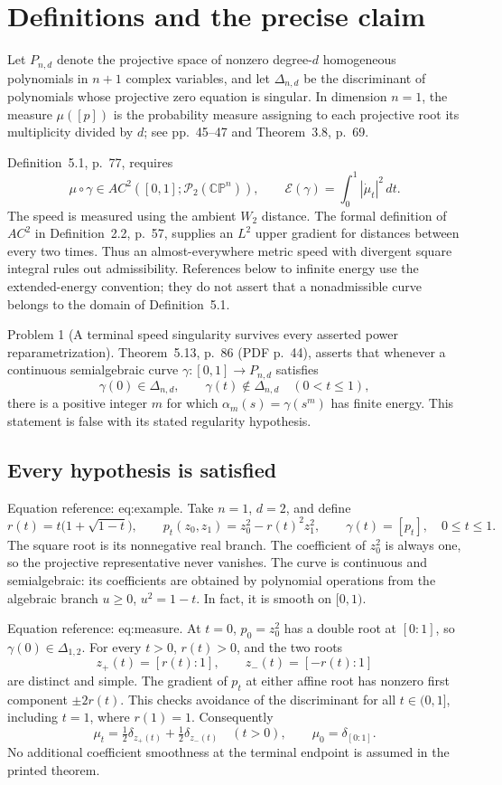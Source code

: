 \documentclass[10pt]{article}
\begin{document}
\section*{Definitions and the precise claim}
Let \(P_{n,d}\) denote the projective space of nonzero degree-\(d\) homogeneous polynomials in \(n+1\) complex variables, and let \(\Delta_{n,d}\) be the discriminant of polynomials whose projective zero equation is singular. In dimension \(n=1\), the measure \(\mu([p])\) is the probability measure assigning to each projective root its multiplicity divided by \(d\); see pp. 45–47 and Theorem 3.8, p. 69.\par
Definition 5.1, p. 77, requires \[\mu\circ\gamma\in AC^2([0,1];\mathcal P_2(\mathbb{CP}^{n})),
 \qquad
 \mathcal E(\gamma)=\int_0^1|\dot\mu_t|^2\,dt.\] The speed is measured using the ambient \(W_2\) distance. The formal definition of \(AC^2\) in Definition 2.2, p. 57, supplies an \(L^2\) upper gradient for distances between every two times. Thus an almost-everywhere metric speed with divergent square integral rules out admissibility. References below to infinite energy use the extended-energy convention; they do not assert that a nonadmissible curve belongs to the domain of Definition 5.1.\par
Problem 1 (A terminal speed singularity survives every asserted power reparametrization).  Theorem 5.13, p. 86 (PDF p. 44), asserts that whenever a continuous semialgebraic curve \(\gamma:[0,1]\to P_{n,d}\) satisfies \[\gamma(0)\in\Delta_{n,d},\qquad
 \gamma(t)\notin\Delta_{n,d}\quad(0<t\leq1),\] there is a positive integer \(m\) for which \(\alpha_m(s)=\gamma(s^m)\) has finite energy. This statement is false with its stated regularity hypothesis.\par
\subsection*{Every hypothesis is satisfied}
Equation reference: eq:example. Take \(n=1\), \(d=2\), and define \[
 r(t)=t\bigl(1+\sqrt{1-t}\bigr),\qquad
 p_t(z_0,z_1)=z_0^2-r(t)^2z_1^2,\qquad
 \gamma(t)=[p_t],\quad 0\leq t\leq1.\] The square root is its nonnegative real branch. The coefficient of \(z_0^2\) is always one, so the projective representative never vanishes. The curve is continuous and semialgebraic: its coefficients are obtained by polynomial operations from the algebraic branch \(u\geq0\), \(u^2=1-t\). In fact, it is smooth on \([0,1)\).\par
Equation reference: eq:measure. At \(t=0\), \(p_0=z_0^2\) has a double root at \([0:1]\), so \(\gamma(0)\in\Delta_{1,2}\). For every \(t>0\), \(r(t)>0\), and the two roots \[z_+(t)=[r(t):1],\qquad z_-(t)=[-r(t):1]\] are distinct and simple. The gradient of \(p_t\) at either affine root has nonzero first component \(\pm2r(t)\). This checks avoidance of the discriminant for all \(t\in(0,1]\), including \(t=1\), where \(r(1)=1\). Consequently \[
 \mu_t=\tfrac12\delta_{z_+(t)}+\tfrac12\delta_{z_-(t)}
 \quad(t>0),\qquad \mu_0=\delta_{[0:1]}.\] No additional coefficient smoothness at the terminal endpoint is assumed in the printed theorem.\par
\end{document}
